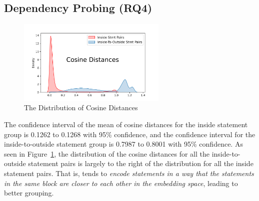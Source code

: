\subsection{Dependency Probing (RQ4)}
\label{sec:rq4}

\begin{figure}[t]
 	\centering
 	\includegraphics[width=2.8in]{rq4-density-v2.png}
        \vspace{-12pt}
 	\caption{The Distribution of Cosine Distances}
 	\label{fig:rq4-density}	
\end{figure}

The confidence interval of the mean of cosine distances for the inside
statement group is 0.1262 to 0.1268 with 95\% confidence, and the
confidence interval for the inside-to-outside statement group is
0.7987 to 0.8001 with 95\% confidence. As seen in
Figure~\ref{fig:rq4-density}, the distribution of the cosine distances
for all the inside-to-outside statement pairs is largely to the right
of the distribution for all the inside statement pairs. That is,
{\tool} tends to {\em encode statements in a way that the statements
  in the same  block are closer to each other in the
  embedding space}, leading to better grouping.


